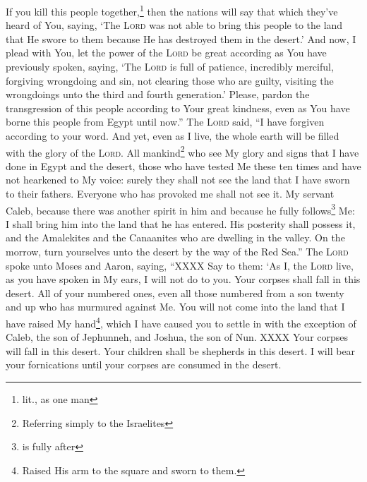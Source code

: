 \begin{enumerate}[align=center]
     If you kill this people together,\footnote{lit., as one man} then the nations will say that which they've heard of You, saying,%
     `The \textsc{Lord} was not able to bring this people to the land that He swore to them because He has destroyed them in the desert.'%
     And now, I plead with You, let the power of the \textsc{Lord} be great according as You have previously spoken, saying,%
     `The \textsc{Lord} is full of patience, incredibly merciful, forgiving wrongdoing and sin, not clearing those who are guilty, visiting the wrongdoings unto the third and fourth generation.'%
     Please, pardon the transgression of this people according to Your great kindness, even as You have borne this people from Egypt until now.''%
     The \textsc{Lord} said, ``I have forgiven according to your word.%
     And yet, even as I live, the whole earth will be filled with the glory of the \textsc{Lord}.%
     All mankind\footnote{Referring simply to the Israelites} who see My glory and signs that I have done in Egypt and the desert, those who have tested Me these ten times and have not hearkened to My voice:%
     surely they shall not see the land that I have sworn to their fathers. Everyone who has provoked me shall not see it.%
     My servant Caleb, because there was another spirit in him and because he fully follows\footnote{is fully after} Me: I shall bring him into the land that he has entered. His posterity shall possess it,%
     and the Amalekites and the Canaanites who are dwelling in the valley. On the morrow, turn yourselves unto the desert by the way of the Red Sea.''%
     The \textsc{Lord} spoke unto Moses and Aaron, saying,%
     ``XXXX%
     Say to them: `As I, the \textsc{Lord} live, as you have spoken in My ears, I will not do to you.%
     Your corpses shall fall in this desert. All of your numbered ones, even all those numbered from a son twenty and up who has murmured against Me.%
     You will not come into the land that I have raised My hand\footnote{Raised His arm to the square and sworn to them.}, which I have caused you to settle in with the exception of Caleb, the son of Jephunneh, and Joshua, the son of Nun.%
     XXXX%
     Your corpses will fall in this desert.%
     Your children shall be shepherds in this desert. I will bear your fornications until your corpses are consumed in the desert.%
\end{enumerate}
